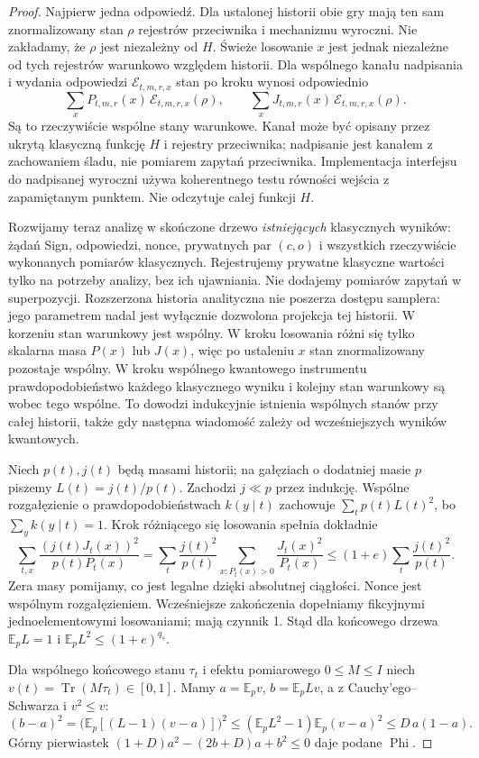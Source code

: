 \documentclass[11pt,a4paper]{article}
\newcommand{\Tr}{\operatorname{Tr}}
\newcommand{\E}{\mathbb E}
\newcommand{\PhiB}{\operatorname{Phi}}
\begin{document}
\begin{proof}
Najpierw jedna odpowiedź. Dla ustalonej historii obie gry mają ten sam
znormalizowany stan $\rho$ rejestrów przeciwnika i mechanizmu wyroczni.
Nie zakładamy, że $\rho$ jest niezależny od $H$.
Świeże losowanie $x$ jest jednak niezależne od tych rejestrów warunkowo
względem historii. Dla wspólnego kanału nadpisania i wydania odpowiedzi
$\mathcal E_{t,m,r,x}$ stan po kroku wynosi odpowiednio
\[
 \sum_xP_{t,m,r}(x)\,\mathcal E_{t,m,r,x}(\rho),\qquad
 \sum_xJ_{t,m,r}(x)\,\mathcal E_{t,m,r,x}(\rho).
\]
Są to rzeczywiście wspólne stany warunkowe. Kanał może być opisany przez
ukrytą klasyczną funkcję $H$ i rejestry przeciwnika; nadpisanie jest kanałem
z zachowaniem śladu, nie pomiarem zapytań przeciwnika. Implementacja
interfejsu do nadpisanej wyroczni używa koherentnego testu równości wejścia
z zapamiętanym punktem. Nie odczytuje całej funkcji $H$.

Rozwijamy teraz analizę w skończone drzewo \emph{istniejących} klasycznych
wyników: żądań Sign, odpowiedzi, nonce, prywatnych par $(c,o)$ i wszystkich
rzeczywiście wykonanych pomiarów klasycznych. Rejestrujemy prywatne
klasyczne wartości tylko na potrzeby analizy, bez ich ujawniania.
Nie dodajemy pomiarów zapytań w superpozycji.
Rozszerzona historia analityczna nie poszerza dostępu samplera: jego
parametrem nadal jest wyłącznie dozwolona projekcja tej historii.
W korzeniu stan warunkowy jest wspólny. W kroku losowania różni się tylko
skalarna masa $P(x)$ lub $J(x)$, więc po ustaleniu $x$ stan znormalizowany
pozostaje wspólny. W kroku wspólnego kwantowego instrumentu prawdopodobieństwo
każdego klasycznego wyniku i kolejny stan warunkowy są wobec tego wspólne.
To dowodzi indukcyjnie istnienia wspólnych stanów przy całej historii,
także gdy następna wiadomość zależy od wcześniejszych wyników kwantowych.

Niech $p(t),j(t)$ będą masami historii; na gałęziach o dodatniej masie $p$
piszemy $L(t)=j(t)/p(t)$. Zachodzi $j\ll p$ przez indukcję.
Wspólne rozgałęzienie o prawdopodobieństwach $k(y\mid t)$ zachowuje
$\sum_t p(t)L(t)^2$, bo $\sum_y k(y\mid t)=1$.
Krok różniącego się losowania spełnia dokładnie
\[
 \sum_{t,x}\frac{(j(t)J_t(x))^2}{p(t)P_t(x)}
 =\sum_t\frac{j(t)^2}{p(t)}
       \sum_{x:P_t(x)>0}\frac{J_t(x)^2}{P_t(x)}
 \le(1+e)\sum_t\frac{j(t)^2}{p(t)}.
\]
Zera masy pomijamy, co jest legalne dzięki absolutnej ciągłości.
Nonce jest wspólnym rozgałęzieniem. Wcześniejsze zakończenia dopełniamy
fikcyjnymi jednoelementowymi losowaniami; mają czynnik 1.
Stąd dla końcowego drzewa $\E_pL=1$ i $\E_pL^2\le(1+e)^{q_s}$.

Dla wspólnego końcowego stanu $\tau_t$ i efektu pomiarowego $0\le M\le I$
niech $v(t)=\Tr(M\tau_t)\in[0,1]$. Mamy $a=\E_pv$, $b=\E_pLv$,
a z Cauchy'ego--Schwarza i $v^2\le v$:
\[
 (b-a)^2
 =\bigl(\E_p[(L-1)(v-a)]\bigr)^2
 \le (\E_pL^2-1)\E_p(v-a)^2
 \le D\,a(1-a).
\]
Górny pierwiastek $(1+D)a^2-(2b+D)a+b^2\le0$ daje podane $\PhiB$.
\end{proof}
\end{document}
